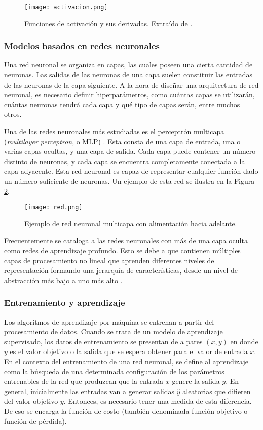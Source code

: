\begin{figure}[H]
  \centering{}
  \texttt{[image: activacion.png]}
  \caption{Funciones de activación y sus derivadas. Extraído de \cite{lagartija}.}
  \label{fig:activación}
\end{figure}

\subsubsection{Modelos basados en redes neuronales}

Una red neuronal se organiza en capas, las cuales poseen una cierta cantidad de neuronas. Las salidas de las neuronas de una capa suelen constituir las entradas de las neuronas de la capa siguiente. A la hora de diseñar una arquitectura de red neuronal, es necesario definir hiperparámetros, como cuántas capas se utilizarán, cuántas neuronas tendrá cada capa y qué tipo de capas serán, entre muchos otros.

Una de las redes neuronales más estudiadas es el perceptrón multicapa (\textit{multilayer perceptron}, o MLP) \cite{MLP2}. Esta consta de una capa de entrada, una o varias capas ocultas, y una capa de salida. Cada capa puede contener un número distinto de neuronas, y cada capa se encuentra completamente conectada a la capa adyacente. Esta red neuronal es capaz de representar cualquier función dado un número suficiente de neuronas. Un ejemplo de esta red se ilustra en la Figura \ref{fig:red}.

\begin{figure}[H]
  \centering{}
  \texttt{[image: red.png]}
  \caption{Ejemplo de red neuronal multicapa con alimentación hacia adelante.}
  \label{fig:red}
\end{figure}

Frecuentemente se cataloga a las redes neuronales con más de una capa oculta como redes de aprendizaje profundo. Esto se debe a que contienen múltiples capas de procesamiento no lineal que aprenden diferentes niveles de representación formando una jerarquía de características, desde un nivel de abstracción más bajo a uno más alto \cite{franchute}.  

\subsubsection{Entrenamiento y aprendizaje}

Los algoritmos de aprendizaje por máquina se entrenan a partir del procesamiento de datos. Cuando se trata de un modelo de aprendizaje supervisado, los datos de entrenamiento se presentan de a pares $(x,y)$ en donde $y$ es el valor objetivo o la salida que se espera obtener para el valor de entrada $x$. En el contexto del entrenamiento de una red neuronal, se define al aprendizaje como la búsqueda de una determinada configuración de los parámetros entrenables de la red que produzcan que la entrada $x$ genere la salida $y$. En general, inicialmente las entradas van a generar salidas $\hat{y}$ aleatorias que difieren del valor objetivo $y$. Entonces, es necesario tener una medida de esta diferencia. De eso se encarga la función de costo (también denominada función objetivo o función de pérdida).

